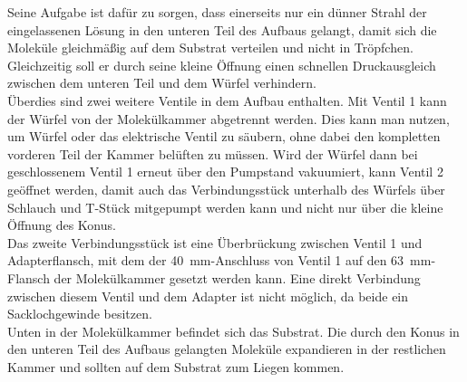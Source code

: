 Seine Aufgabe ist dafür zu sorgen, dass einerseits nur ein dünner Strahl der eingelassenen Lösung in
den unteren Teil des Aufbaus gelangt, damit sich die Moleküle gleichmäßig auf dem Substrat verteilen und
nicht in Tröpfchen. Gleichzeitig soll er durch seine kleine Öffnung einen schnellen Druckausgleich zwischen
dem unteren Teil und dem Würfel verhindern.
 \\
Überdies sind zwei weitere Ventile in dem Aufbau enthalten. Mit Ventil 1 kann der Würfel von der
Molekülkammer abgetrennt werden. Dies kann man nutzen, um Würfel oder das elektrische Ventil zu säubern, ohne
dabei den kompletten vorderen Teil der Kammer belüften zu müssen. Wird der Würfel dann bei
geschlossenem Ventil 1 erneut über den Pumpstand vakuumiert, kann Ventil 2 geöffnet werden, damit auch das Verbindungsstück
unterhalb des Würfels über Schlauch und T-Stück mitgepumpt werden kann und nicht nur über die kleine Öffnung
des Konus.
\\
Das zweite Verbindungsstück ist eine Überbrückung zwischen Ventil 1 und Adapterflansch, mit dem
der \SI{40}{mm}-Anschluss von Ventil 1 %
auf den \SI{63}{mm}-Flansch der Molekülkammer gesetzt werden kann. Eine direkt Verbindung zwischen
diesem Ventil und dem Adapter ist nicht möglich, da beide ein Sacklochgewinde besitzen.\\
Unten in der Molekülkammer befindet sich das Substrat. Die durch den Konus in den unteren Teil des Aufbaus
gelangten Moleküle expandieren in der restlichen Kammer und sollten auf dem Substrat zum Liegen
kommen.

\FloatBarrier

